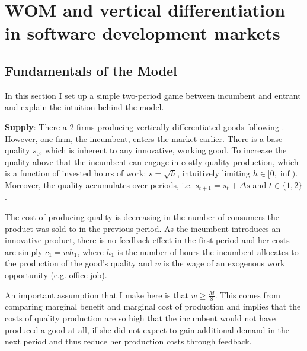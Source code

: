 \documentclass{article}
\numberwithin{figure}{section}
\numberwithin{table}{section}
\theoremstyle{indented}
\numberwithin{equation}{section} %
\begin{document}

\setcounter{tocdepth}{2}
\addtocounter{page}{-1}


\section{WOM and vertical differentiation in software development markets}


\subsection{Fundamentals of the Model} \label{model}
 
 In this section I set up a simple two-period game between incumbent and entrant and explain the intuition behind the model.

\textbf{Supply}:
There a 2 firms producing vertically differentiated goods following  \citet{Tirole}. However, one firm, the incumbent, enters the market earlier. There is a base quality $s_0$, which is inherent to any innovative, working good. To increase the quality above that the incumbent can engage in costly quality production, which is a function of invested hours of work: $s=\sqrt{h}$, intuitively limiting $h \in [0,\inf)$. Moreover, the quality accumulates over periods, i.e. $s_{t+1}=s_{t}+\Delta s$ and $t \in \{1,2\}$. 

The cost of producing quality is decreasing in the number of consumers the product was sold to in the previous period. As the incumbent introduces an innovative product, there is no feedback effect in the first period and her costs are simply $c_1= wh_1$, where $h_1$ is the number of hours the incumbent allocates to the production of the good's quality and $w$ is the wage of an exogenous work opportunity (e.g. office job). 

An important assumption that I make here is that $w\geq\tfrac{M}{8}$. This comes from comparing marginal benefit and marginal cost of production and implies that the costs of quality production are so high that the incumbent would not have produced a good at all, if she did not expect to gain additional demand in the next period and thus reduce her production costs through feedback. 
\end{document}
